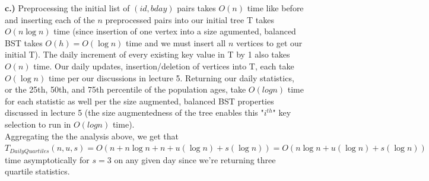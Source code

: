 \documentclass[11pt]{article}
\begin{document}
\begin{enumerate}
{\textbf{c.)} Preprocessing the initial list of $(id, bday)$ pairs takes $O(n)$ time like before and inserting each of the $n$ preprocessed pairs into our initial tree T takes $O(n\log{n})$ time (since insertion of one vertex into a size agumented, balanced BST takes $O(h) = O(\log{n})$ time and we must insert all $n$ vertices to get our initial T). The daily increment of every existing key value in T by 1 also takes $O(n)$ time. Our daily updates, insertion/deletion of vertices into T, each take $O(\log{n})$ time per our discussions in lecture 5. Returning our daily statistics, or the 25th, 50th, and 75th percentile of the population ages, take $O(log{n})$ time for each statistic as well per the size augmented, balanced BST properties discussed in lecture 5 (the size augmentedness of the tree enables this "$i^{th}$" key selection to run in $O(log{n})$ time). \\
Aggregating the the analysis above, we get that $T_{DailyQuartiles}(n, u, s) = O(n + n\log{n} + n + u(\log{n}) + s(\log{n})) = O(n\log{n} + u(\log{n}) + s(\log{n}))$ time asymptotically for $s=3$ on any given day since we're returning three quartile statistics.
} \\
\\


\end{enumerate}
\end{document}
